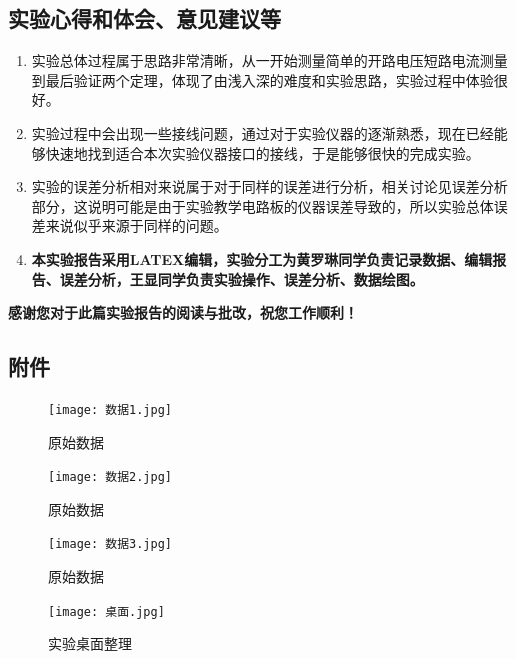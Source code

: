 \documentclass[dvipsnames, svgnames,a4paper,11pt]{article}
\begin{document}
	
	\subsection{实验心得和体会、意见建议等}
	\begin{enumerate}
		\item 实验总体过程属于思路非常清晰，从一开始测量简单的开路电压短路电流测量到最后验证两个定理，体现了由浅入深的难度和实验思路，实验过程中体验很好。
		\item 实验过程中会出现一些接线问题，通过对于实验仪器的逐渐熟悉，现在已经能够快速地找到适合本次实验仪器接口的接线，于是能够很快的完成实验。
		\item 实验的误差分析相对来说属于对于同样的误差进行分析，相关讨论见误差分析部分，这说明可能是由于实验教学电路板的仪器误差导致的，所以实验总体误差来说似乎来源于同样的问题。
		\item \textbf{本实验报告采用LATEX编辑，实验分工为黄罗琳同学负责记录数据、编辑报告、误差分析，王显同学负责实验操作、误差分析、数据绘图。}
	\end{enumerate}
	\quad \large \textbf{感谢您对于此篇实验报告的阅读与批改，祝您工作顺利！}
	

	\subsection{附件}
	
	\begin{figure}[H]
		\begin{minipage}[b]{0.45\linewidth}
			\centering
			\texttt{[image: 数据1.jpg]}
			\caption{原始数据}
		\end{minipage}
		\hfill
		\begin{minipage}[b]{0.45\linewidth}
			\centering
			\texttt{[image: 数据2.jpg]}
			\caption{原始数据}
		\end{minipage}
	\end{figure}
	
	\begin{figure}[H]
		\begin{minipage}[b]{0.45\linewidth}
			\centering
			\texttt{[image: 数据3.jpg]}
			\caption{原始数据}
		\end{minipage}
		\hfill
		\begin{minipage}[b]{0.45\linewidth}
			\centering
			\texttt{[image: 桌面.jpg]}
			\caption{实验桌面整理}
		\end{minipage}
	\end{figure}
	
	
	

	
	
\end{document}
